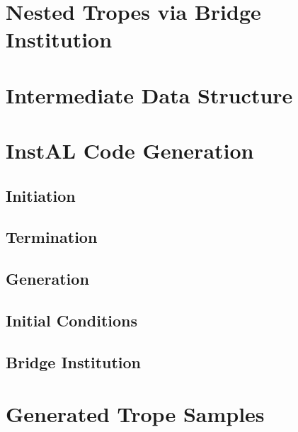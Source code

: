 \section{Nested Tropes via Bridge Institution}
\label{sec:t-nested}

\section{Intermediate Data Structure}
\label{sec:t-intermediate}

\section{InstAL Code Generation}
\label{sec:t-codegen}

\subsection{Initiation}

\subsection{Termination}

\subsection{Generation}

\subsection{Initial Conditions}

\subsection{Bridge Institution}

\section{Generated Trope Samples}
\label{sec:t-tropes}

